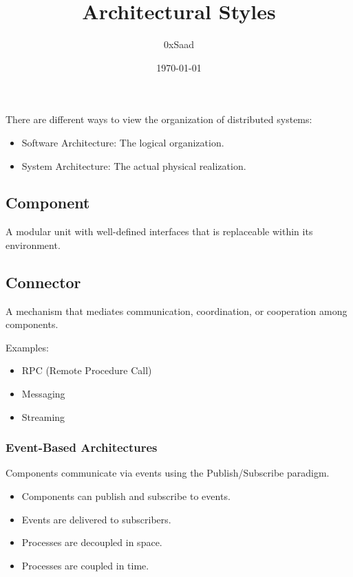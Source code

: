 \documentclass{article}
\title{Architectural Styles}
\author{0xSaad}
\date{\today}
\begin{document}
\maketitle

There are different ways to view the organization of distributed systems:

\begin{itemize}
    \item Software Architecture: The logical organization.
    \item System Architecture: The actual physical realization.
\end{itemize}

\subsection{Component}

A modular unit with well-defined interfaces that is replaceable within its environment.

\subsection{Connector}

A mechanism that mediates communication, coordination, or cooperation among components.

Examples:
\begin{itemize}
    \item RPC (Remote Procedure Call)
    \item Messaging
    \item Streaming
\end{itemize}

\subsubsection{Event-Based Architectures}

Components communicate via events using the Publish/Subscribe paradigm.

\begin{itemize}
    \item Components can publish and subscribe to events.
    \item Events are delivered to subscribers.
    \item Processes are decoupled in space.
    \item Processes are coupled in time.
\end{itemize}
\end{document}
